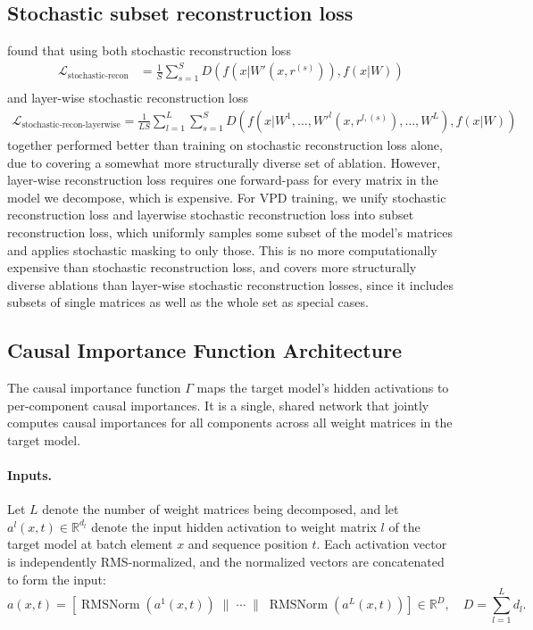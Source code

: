 \documentclass{article}
\begin{document}
\subsection{Stochastic subset reconstruction loss}
\cite{bushnaq2025spd} found that using both stochastic reconstruction loss
\begin{equation}
\begin{aligned}
\mathcal{L}_{\text{stochastic-recon}}&=\frac{1}{S}\sum^S_{s=1}D \left( f(x\vert W'(x,r^{(s)})),f(x\vert W) \right)\,\\
\end{aligned}
\end{equation}
and layer-wise stochastic reconstruction loss 
\begin{equation}\label{eq:layerwise_random_recon}
\begin{aligned}
\mathcal{L}_{\text{stochastic-recon-layerwise}}=\frac{1}{LS}\sum^L_{l=1}\sum^S_{s=1}D \left( f(x\vert W^1,\dots,W'^l(x,r^{l, (s)}),\dots,W^L),f(x\vert W) \right)\,
\end{aligned}
\end{equation}
together performed better than training on stochastic reconstruction loss alone, due to covering a somewhat more structurally diverse set of ablation. However, layer-wise reconstruction loss requires one forward-pass for every matrix in the model we decompose, which is expensive. For VPD training, we unify stochastic reconstruction loss and layerwise stochastic reconstruction loss into subset reconstruction loss, which uniformly samples some subset of the model's matrices and applies stochastic masking to only those. This is no more computationally expensive than stochastic reconstruction loss, and covers more structurally diverse ablations than layer-wise stochastic reconstruction losses, since it includes subsets of single matrices as well as the whole set as special cases.

\subsection{Causal Importance Function Architecture}

The causal importance function $\Gamma$ maps the target model's hidden activations to
per-component causal importances. It is a single, shared network that jointly computes causal
importances for all components across all weight matrices in the target model.

\paragraph{Inputs.}
Let $L$ denote the number of weight matrices being decomposed, and let $a^l(x,t) \in
\mathbb{R}^{d_l}$ denote the input hidden activation to weight matrix $l$ of the target model at batch element $x$ and
sequence position $t$. Each activation vector is independently RMS-normalized, and the
normalized vectors are concatenated to form the input:
\begin{equation}
  a(x, t) = \left[
    \operatorname{RMSNorm}(a^1(x,t)) \;\|\; \cdots \;\|\;
    \operatorname{RMSNorm}(a^L(x,t))
  \right] \in \mathbb{R}^{D},
  \quad D = \sum_{l=1}^{L} d_l.
\end{equation}
\end{document}

